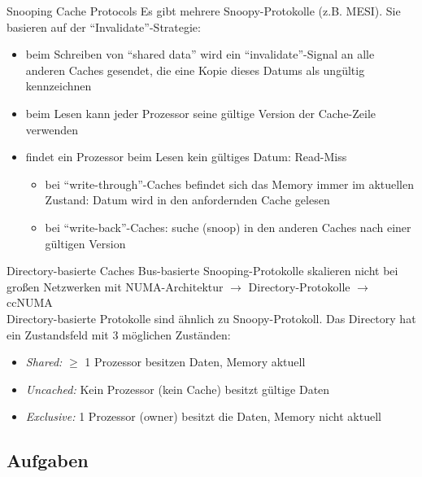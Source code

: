 \begin{defi}{Snooping Cache Protocols}
    Es gibt mehrere Snoopy-Protokolle (z.B. MESI). 
    Sie basieren auf der \enquote{Invalidate}-Strategie:
    \begin{itemize}
        \item beim Schreiben von \enquote{shared data} wird ein \enquote{invalidate}-Signal an alle anderen Caches gesendet,
              die eine Kopie dieses Datums als ungültig kennzeichnen
        \item beim Lesen kann jeder Prozessor seine gültige Version der Cache-Zeile verwenden
        \item findet ein Prozessor beim Lesen kein gültiges Datum: Read-Miss
              \begin{itemize}
                  \item bei \enquote{write-through}-Caches befindet sich das Memory immer im aktuellen Zustand:
                        Datum wird in den anfordernden Cache gelesen
                  \item bei \enquote{write-back}-Caches:
                        suche (snoop) in den anderen Caches nach einer gültigen Version
              \end{itemize}
    \end{itemize}
\end{defi}

\begin{defi}{Directory-basierte Caches}
    Bus-basierte Snooping-Protokolle skalieren nicht bei großen Netzwerken mit NUMA-Architektur 
    $\to$ Directory-Protokolle $\to$ ccNUMA \\
    Directory-basierte Protokolle sind ähnlich zu Snoopy-Protokoll.
    Das Directory hat ein Zustandsfeld mit 3 möglichen Zuständen:
    \begin{itemize}
        \item \emph{Shared:}     $\geq$ 1 Prozessor besitzen Daten, Memory aktuell
        \item \emph{Uncached:}   Kein Prozessor (kein Cache) besitzt gültige Daten
        \item \emph{Exclusive:}  1 Prozessor (owner) besitzt die Daten, Memory nicht aktuell
    \end{itemize}
\end{defi}

\subsection{Aufgaben}

